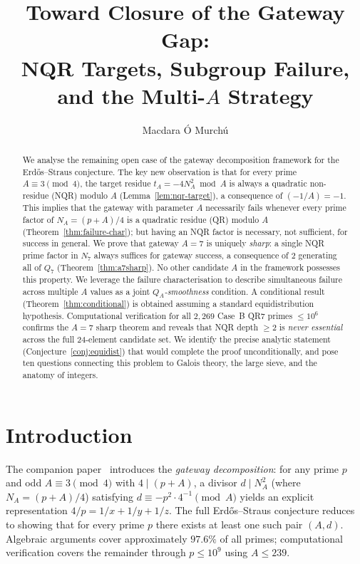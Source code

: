 \documentclass[12pt]{amsart}
\title[Toward Closure of the Gateway Gap]{Toward Closure of the Gateway Gap:\\
NQR Targets, Subgroup Failure, and the Multi-$A$ Strategy}
\author{Macdara \'O Murch\'u}
\theoremstyle{definition}
\theoremstyle{remark}
\begin{document}
\begin{abstract}
We analyse the remaining open case of the gateway decomposition framework
for the Erd\H{o}s--Straus conjecture.
The key new observation is that for every prime $A \equiv 3 \pmod{4}$,
the target residue $t_A = -4N_A^2 \bmod A$
is always a quadratic non-residue (\textsc{NQR}) modulo $A$
(Lemma~\ref{lem:nqr-target}),
a consequence of $(-1/A) = -1$.
This implies that the gateway with parameter $A$ necessarily fails
whenever every prime factor of $N_A = (p+A)/4$ is a quadratic residue
(\textsc{QR}) modulo $A$ (Theorem~\ref{thm:failure-char});
but having an NQR factor is necessary, not sufficient, for success
in general.
We prove that gateway $A = 7$ is uniquely \emph{sharp}:
a single NQR prime factor in $N_7$ always suffices for gateway success,
a consequence of $2$ generating all of $Q_7$
(Theorem~\ref{thm:a7sharp}).
No other candidate $A$ in the framework possesses this property.
We leverage the failure characterisation to describe simultaneous failure
across multiple $A$ values as a joint \emph{$Q_A$-smoothness} condition.
A conditional result (Theorem~\ref{thm:conditional}) is obtained
assuming a standard equidistribution hypothesis.
Computational verification for all $2{,}269$ Case~B QR7 primes $\le 10^6$
confirms the $A=7$ sharp theorem and reveals that NQR depth $\ge 2$
is \emph{never essential} across the full 24-element candidate set.
We identify the precise analytic statement
(Conjecture~\ref{conj:equidist}) that would complete the proof unconditionally,
and pose ten questions connecting this problem to
Galois theory, the large sieve, and the anatomy of integers.
\end{abstract}

\maketitle

\tableofcontents

\section{Introduction}

The companion paper~\cite{Gateway2026} introduces the \emph{gateway decomposition}:
for any prime $p$ and odd $A \equiv 3 \pmod{4}$ with $4 \mid (p+A)$,
a divisor $d \mid N_A^2$ (where $N_A = (p+A)/4$) satisfying
$d \equiv -p^2 \cdot 4^{-1} \pmod{A}$ yields an explicit representation
$4/p = 1/x + 1/y + 1/z$.
The full Erd\H{o}s--Straus conjecture reduces to showing that for every prime $p$
there exists at least one such pair $(A,d)$.
Algebraic arguments cover approximately $97.6\%$ of all primes;
computational verification covers the remainder through $p \le 10^9$
using $A \le 239$.
\end{document}
